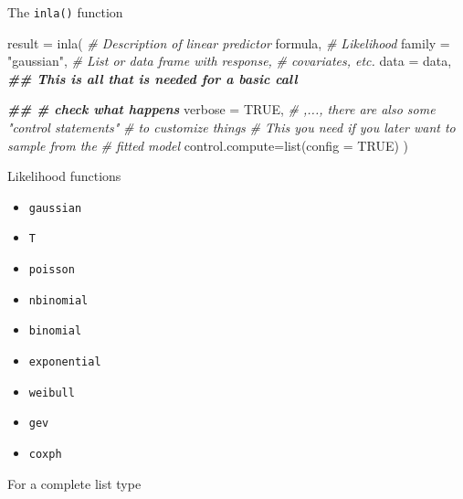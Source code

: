\documentclass[
  ignorenonframetext,
]{beamer}
\newenvironment{Shaded}{\begin{snugshade}}{\end{snugshade}}
\newcommand{\AttributeTok}[1]{\textcolor[rgb]{0.77,0.63,0.00}{#1}}
\newcommand{\CommentTok}[1]{\textcolor[rgb]{0.56,0.35,0.01}{\textit{#1}}}
\newcommand{\ConstantTok}[1]{\textcolor[rgb]{0.00,0.00,0.00}{#1}}
\newcommand{\DocumentationTok}[1]{\textcolor[rgb]{0.56,0.35,0.01}{\textbf{\textit{#1}}}}
\newcommand{\FunctionTok}[1]{\textcolor[rgb]{0.00,0.00,0.00}{#1}}
\newcommand{\NormalTok}[1]{#1}
\newcommand{\OtherTok}[1]{\textcolor[rgb]{0.56,0.35,0.01}{#1}}
\newcommand{\SpecialCharTok}[1]{\textcolor[rgb]{0.00,0.00,0.00}{#1}}
\newcommand{\StringTok}[1]{\textcolor[rgb]{0.31,0.60,0.02}{#1}}
\begin{document}
\begin{frame}[fragile]{The \texttt{inla()} function}
\protect\hypertarget{the-inla-function}{}
\small

\begin{Shaded}
\begin{Highlighting}[]
\NormalTok{result }\OtherTok{=} \FunctionTok{inla}\NormalTok{(}
  \CommentTok{\# Description of linear predictor}
\NormalTok{  formula,}
  \CommentTok{\# Likelihood}
  \AttributeTok{family =} \StringTok{"gaussian"}\NormalTok{,}
  \CommentTok{\# List or data frame with response, }
  \CommentTok{\# covariates, etc. }
  \AttributeTok{data =}\NormalTok{ data,}
  \DocumentationTok{\#\# This is all that is needed for a basic call }

  \DocumentationTok{\#\# \# check what happens}
  \AttributeTok{verbose =} \ConstantTok{TRUE}\NormalTok{,}
  \CommentTok{\# ,..., there are also some "control statements"}
  \CommentTok{\# to customize things}
  \CommentTok{\# This you need if you later want to sample from the}
  \CommentTok{\# fitted model}
  \AttributeTok{control.compute=}\FunctionTok{list}\NormalTok{(}\AttributeTok{config =} \ConstantTok{TRUE}\NormalTok{)}
\NormalTok{  )}
\end{Highlighting}
\end{Shaded}

\normalsize
\end{frame}

\begin{frame}[fragile]{Likelihood functions}
\protect\hypertarget{likelihood-functions}{}
\begin{itemize}
\item
  \texttt{gaussian}
\item
  \texttt{T}
\item
  \texttt{poisson}
\item
  \texttt{nbinomial}
\item
  \texttt{binomial}
\item
  \texttt{exponential}
\item
  \texttt{weibull}
\item
  \texttt{gev}
\item
  \texttt{coxph}
\end{itemize}

For a complete list type

\begin{Shaded}
\end{Shaded}
\end{frame}
\end{document}
